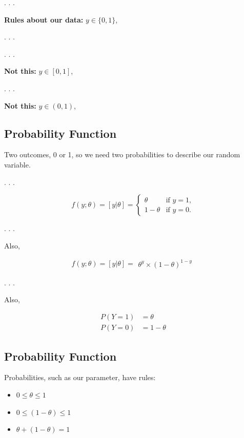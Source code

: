 \documentclass[
  letterpaper,
  DIV=11,
  numbers=noendperiod]{scrartcl}
\begin{document}
. . .

\textbf{Rules about our data:} \(y \in \{0,1\}\),

. . .

. . .

\textbf{Not this:} \(y \in [0,1]\),

. . .

\textbf{Not this:} \(y \in (0,1)\),

\hypertarget{probability-function}{%
\subsection{Probability Function}\label{probability-function}}

Two outcomes, 0 or 1, so we need two probabilities to describe our
random variable.

. . .

\[
  f(y;\theta) = [y|\theta]= 
  \begin{cases}
    \theta     & \text{if $y = 1$}, \\
    1 - \theta & \text{if $y = 0$}.
  \end{cases}
\]

. . .

Also,

\[
f(y;\theta) = [y|\theta]=
  \begin{align}
        \theta^{y}\times(1-\theta)^{1-y}
  \end{align}
\]

. . .

Also,

\[
  \begin{align}
        P(Y=1) &= \theta \\
        P(Y=0) &= 1-\theta  
  \end{align}
\]

\hypertarget{probability-function-1}{%
\subsection{Probability Function}\label{probability-function-1}}

Probabilities, such as our parameter, have rules:

\begin{itemize}
\item
  \(0 \leq \theta \leq 1\)
\item
  \(0 \leq (1 - \theta) \leq 1\)
\item
  \(\theta + (1-\theta) = 1\)
\end{itemize}
\end{document}
